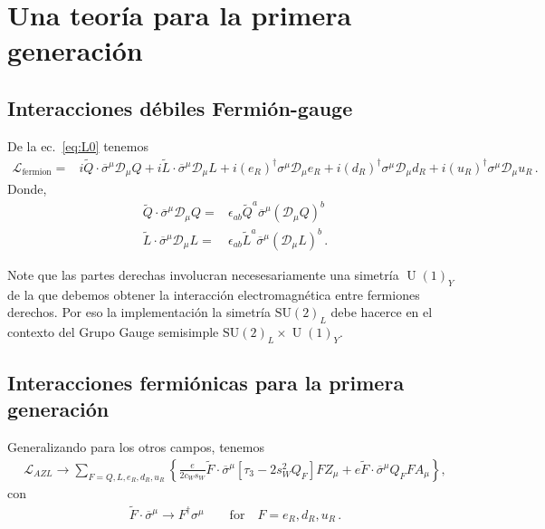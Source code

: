 \section{Una teoría para la primera generación}

\subsection{Interacciones débiles Fermión-gauge }

\begin{frame}
De la ec.~\eqref{eq:L0} tenemos
\begin{align}
  \label{eq:lfermion}
  \mathcal{L}_{\text{fermion}}=&i \widetilde{Q}\cdot\overline{\sigma}^\mu\mathcal{D}_\mu Q+i \widetilde{L}\cdot\overline{\sigma}^\mu\mathcal{D}_\mu L+
i(e_R)^{\dagger}\sigma^\mu\mathcal{D}_\mu {e_R}+i(d_R)^{\dagger}\sigma^\mu\mathcal{D}_\mu {d_R}+i(u_R)^{\dagger}\sigma^\mu\mathcal{D}_\mu {u_R}\,.
\end{align}
Donde, 
\begin{align}
  \widetilde{Q}\cdot\overline{\sigma}^\mu\mathcal{D}_\mu Q=&
  \epsilon_{ab}\widetilde{Q}^a\overline{\sigma}^\mu \left( \mathcal{D}_\mu Q \right)^b \nonumber\\
  \widetilde{L}\cdot\overline{\sigma}^\mu\mathcal{D}_\mu L=&
  \epsilon_{ab}\widetilde{L}^a\overline{\sigma}^\mu \left( \mathcal{D}_\mu L \right)^b\,.
\end{align}

Note que las partes derechas involucran necesesariamente una simetría $\operatorname{U}(1)_Y$ de la que debemos obtener la interacción electromagnética entre fermiones derechos. Por eso la implementación la simetría $\operatorname{SU(2)}_L$ debe hacerce en el contexto del Grupo Gauge semisimple $\operatorname{SU(2)}_L\times \operatorname{U}(1)_Y$.


\subsection{Interacciones fermiónicas para la primera generación}


Generalizando para los otros campos, tenemos
\begin{align}
  \label{eq:azl}
      \mathcal{L}_{A Z L}\to\sum_{F=Q,L,e_R,d_R,u_R}
\left\{  \frac{e}{2c_W s_W}\widetilde{F}\cdot\overline{\sigma}^{\mu}\left[ \tau_3-2s_W^2 Q_F\right]F Z_\mu
       +e\widetilde{F}\cdot\overline{\sigma}^\mu Q_F F A_\mu\right\},
\end{align}
con
\begin{align}
  \widetilde{F}\cdot\overline{\sigma}^{\mu} \to F^{\dagger}\sigma^{\mu} \qquad \text{for}\quad F=e_R,d_R,u_R\,.
\end{align}





\end{frame}
